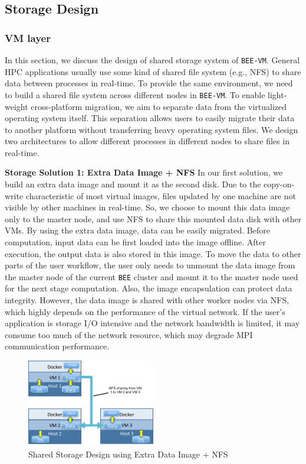 \subsection{Storage Design}
\subsubsection{VM layer}
In this section, we discuss the design of shared storage system of \texttt{BEE-VM}. General HPC applications usually use some kind of shared file system (e.g., NFS) to share data between processes in real-time. To provide the same environment, we need to build a shared file system across different nodes in \texttt{BEE-VM}. To enable light-weight cross-platform migration, we aim to separate data from the virtualized operating system itself. This separation allows users to easily migrate their data to another platform without transferring heavy operating system files. We design two architectures to allow different processes in different nodes to share files in real-time.

\textbf{Storage Solution 1: Extra Data Image + NFS}
In our first solution, we build an extra data image and mount it as the second disk. Due to the copy-on-write characteristic of most virtual images, files updated by one machine are not visible by other machines in real-time. So, we choose to mount this data image only to the master node, and use NFS to share this mounted data disk with other VMs. By using the extra data image, data can be easily migrated.  Before computation, input data can be first loaded into the image offline. After execution, the output data is also stored in this image. To move the data to other parts of the user workflow, the user only needs to unmount the data image from the master node of the current \texttt{BEE} cluster and mount it to the master node used for the next stage computation. Also, the image encapsulation can protect data integrity. However, the data image is shared with other worker nodes via NFS, which highly depends on the performance of the virtual network. If the user's application is storage I/O intensive and the network bandwidth is limited, it may consume too much of the network resource, which may degrade MPI communication performance.


\begin{figure}[h]
    \centering
    \includegraphics[width=0.5\textwidth]{figures/fs1.pdf}
    \caption{Shared Storage Design using Extra Data Image + NFS}
    \label{fs1}
\end{figure}


